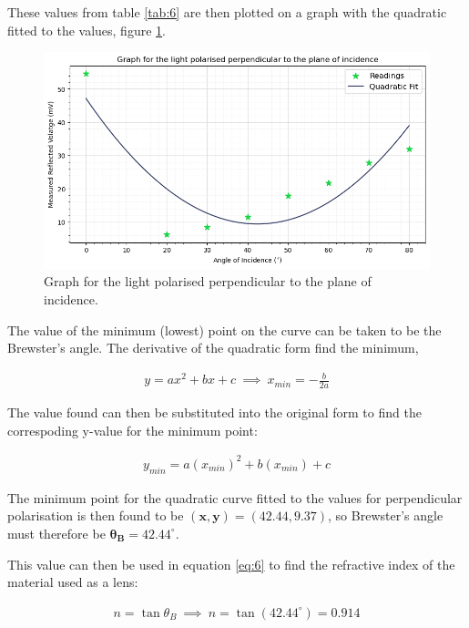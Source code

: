 \documentclass[12pt]{article}
\begin{document}
These values from table \ref{tab:6} are then plotted on a graph with the quadratic fitted to the values, figure \ref{fig:perpgraph}.

\begin{figure}[H]
    \centering
    \includegraphics[width=\textwidth]{perpgraph.png}
    \caption{\centering Graph for the light polarised perpendicular to the plane of incidence.}
    \label{fig:perpgraph}
\end{figure}

The value of the minimum (lowest) point on the curve can be taken to be the Brewster's angle. The derivative of the quadratic form find the minimum,

\begin{gather} \label{eq:10}
    y = ax^2 + bx + c \: \implies \: x_{min}=-\frac{b}{2a}
\end{gather}

The value found can then be substituted into the original form to find the correspoding y-value for the minimum point:

\begin{gather} \label{eq:11}
    y_{min} = a(x_{min})^2 + b(x_{min}) + c
\end{gather}

The minimum point for the quadratic curve fitted to the values for perpendicular polarisation is then found to be $\mathbf{(x,y) = (42.44,9.37)}$, so Brewster's angle must therefore be $\mathbf{\theta_B = 42.44^{\circ}}$.

This value can then be used in equation \ref{eq:6} to find the refractive index of the material used as a lens:

\vspace{-1.5em}
\begin{gather*}
    n= \tan \theta_B \: \implies \: n = \tan(42.44^{\circ}) = 0.914
\end{gather*}
\end{document}

